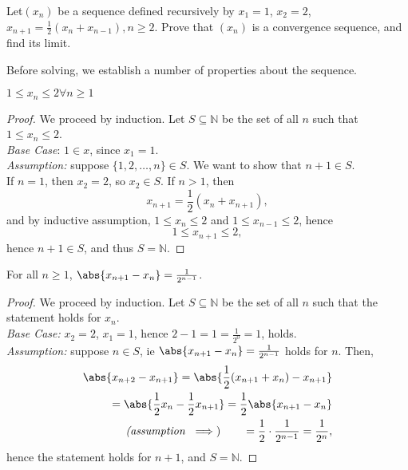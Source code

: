\documentclass[12pt]{article}
\begin{document}
\begin{example}\label{example:recursivenessity}
  Let\footnotemark $(x_n)$ be a sequence defined recursively by $x_1 = 1$, $x_2 = 2$, $x_{n+1} = \frac{1}{2}(x_n + x_{n-1}), n \geq 2$. Prove that $(x_n)$ is a convergence sequence, and find its limit.
\end{example}
\begin{remark}
  Before solving, we establish a number of properties about the sequence.
\end{remark}
\begin{proposition}[Property I]\label{prop:exercisecauchypropI}
  $1 \leq x_n \leq 2 \forall n \geq 1$
\end{proposition}
\begin{proof}
  We proceed by induction. Let $S \subseteq \mathbb{N}$ be the set of all $n$ such that $1 \leq x_n \leq 2$. \\
  \textit{Base Case}: $1 \in x$, since $x_1 = 1$.\\
  \textit{Assumption:} suppose $\{1,2, \dots, n\} \in S$. We want to show that $n+1 \in S$.\\
  If $n = 1$, then $x_2 = 2$, so $x_2 \in S$. If $n > 1$, then \[x_{n+1} = \frac{1}{2} (x_n + x_{n+1}),\] and by inductive assumption, $1 \leq x_n \leq 2$ and $1 \leq x_{n-1} \leq 2$, hence $$1 \leq x_{n+1} \leq 2,$$ hence $n+1 \in S$, and thus $S = \mathbb{N}$.
\end{proof}
\begin{proposition}[Property II]\label{prop:exercisecauchypropII}
  For all $n \geq 1$, $\abs{x_{n+1} - x_n} = \frac{1}{2^{n-1}}$.
\end{proposition}
\begin{proof}
  We proceed by induction. Let $S \subseteq \mathbb{N}$ be the set of all $n$ such that the statement holds for $x_n$.\\
  \textit{Base Case: } $x_2 = 2$, $x_1 = 1$, hence $2 - 1 = 1 = \frac{1}{2^0} = 1$, holds.\\
  \textit{Assumption: } suppose $n \in S$, ie $\abs{x_{n+1} - x_{n}} = \frac{1}{2^{n-1}}$ holds for $n$. Then, \begin{align*}
    \abs{x_{n+2} - x_{n+1}} = \abs{\frac{1}{2}(x_{n+1} + x_n) - x_{n+1}}\\
    = \abs{\frac{1}{2} x_n - \frac{1}{2} x_{n+1}} = \frac{1}{2} \abs{x_{n+1} - x_n}\\
    \textit{(assumption } \implies )\qquad = \frac{1}{2} \cdot \frac{1}{2^{n-1}} = \frac{1}{2^{n}},
  \end{align*}
  hence the statement holds for $n+1$, and $S = \mathbb{N}$.
\end{proof}
\end{document}
